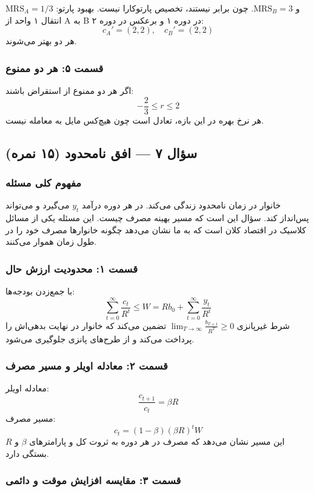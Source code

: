 \documentclass[12pt,a4paper]{article}
\newcommand{\MRS}{\mathrm{MRS}}
\begin{document}
$\MRS_A = 1/3$ و $\MRS_B = 3$. چون برابر نیستند، تخصیص پارتوکارا نیست. بهبود پارتو: انتقال ۱ واحد از A به B در دوره ۱ و برعکس در دوره ۲:
\[
	c_A' = (2, 2), \quad c_B' = (2, 2)
\]
هر دو بهتر می‌شوند.

\subsubsection*{قسمت ۵: هر دو ممنوع}

اگر هر دو ممنوع از استقراض باشند:
\[
	-\frac{2}{3} \leq r \leq 2
\]
هر نرخ بهره در این بازه، تعادل است چون هیچ‌کس مایل به معامله نیست.

\subsection{سؤال ۷ — افق نامحدود (۱۵ نمره)}

\subsubsection*{مفهوم کلی مسئله}

خانوار در زمان نامحدود زندگی می‌کند. در هر دوره درآمد $y_t$ می‌گیرد و می‌تواند پس‌انداز کند. سؤال این است که مسیر بهینه مصرف چیست. این مسئله یکی از مسائل کلاسیک در اقتصاد کلان است که به ما نشان می‌دهد چگونه خانوارها مصرف خود را در طول زمان هموار می‌کنند.

\subsubsection*{قسمت ۱: محدودیت ارزش حال}

با جمع‌زدن بودجه‌ها:
\[
	\sum_{t=0}^{\infty} \frac{c_t}{R^t} \leq W = R b_0 + \sum_{t=0}^{\infty} \frac{y_t}{R^t}
\]
شرط غیرپانزی $\lim_{T \to \infty} \frac{b_{T+1}}{R^T} \geq 0$ تضمین می‌کند که خانوار در نهایت بدهی‌اش را پرداخت می‌کند و از طرح‌های پانزی جلوگیری می‌شود.

\subsubsection*{قسمت ۲: معادله اویلر و مسیر مصرف}

معادله اویلر:
\[
	\frac{c_{t+1}}{c_t} = \beta R
\]
مسیر مصرف:
\[
	c_t = (1 - \beta) (\beta R)^t W
\]
این مسیر نشان می‌دهد که مصرف در هر دوره به ثروت کل و پارامترهای $\beta$ و $R$ بستگی دارد.

\subsubsection*{قسمت ۳: مقایسه افزایش موقت و دائمی}
\end{document}
